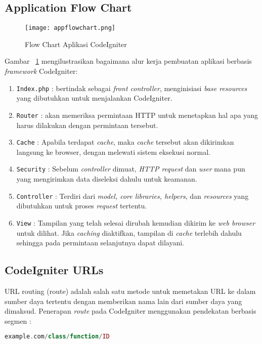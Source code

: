\subsection{Application Flow Chart}
\begin{figure} [H]
	\centering  
	\texttt{[image: appflowchart.png]}  
	\caption{Flow Chart Aplikasi CodeIgniter}
	\label{fig:flowChartCodeIgniter} 
\end{figure}
\noindent Gambar ~\ref{fig:flowChartCodeIgniter} mengilustrasikan bagaimana alur kerja pembuatan aplikasi berbasis \textit{framework} CodeIgniter:
\begin{enumerate}
	\item \texttt{Index.php} : bertindak sebagai \textit{front controller}, menginisiasi \textit{base resources} yang dibutuhkan untuk menjalankan CodeIgniter.
	\item \texttt{Router} : akan memeriksa permintaan HTTP untuk menetapkan hal apa yang harus dilakukan dengan permintaan tersebut.
	\item \texttt{Cache} : Apabila terdapat \textit{cache}, maka \textit{cache} tersebut akan dikirimkan langsung ke browser, dengan melewati sistem eksekusi normal.
	\item \texttt{Security} : Sebelum \textit{controller} dimuat, \textit{HTTP request} dan \textit{user} mana pun yang mengirimkan data diseleksi dahulu untuk keamanan.
	\item \texttt{Controller} : Terdiri dari \textit{model, core libraries, helpers}, dan \textit{resources} yang dibutuhkan untuk proses \textit{request} tertentu.
	\item \texttt{View} : Tampilan yang telah selesai dirubah kemudian dikirim ke \textit{web browser} untuk dilihat. Jika \textit{caching} diaktifkan, tampilan di \textit{cache} terlebih dahulu sehingga pada permintaan selanjutnya dapat dilayani.
	\cite{codeigniter}
\end{enumerate}

\subsection{CodeIgniter URLs}
URL routing (route) adalah salah satu metode untuk memetakan URL ke dalam sumber daya tertentu dengan memberikan nama lain dari sumber daya yang dimaksud.
Penerapan \textit{route} pada CodeIgniter menggunakan pendekatan berbasis segmen :
\begin{lstlisting}[style=customphp, language=PHP, basicstyle=\ttfamily, frame=single, columns=fullflexible, keepspaces=true, breaklines=true, showstringspaces=false, label={lst:urlCI}, caption=Kode URLs pada CodeIgniter] 
example.com/class/function/ID
\end{lstlisting}

